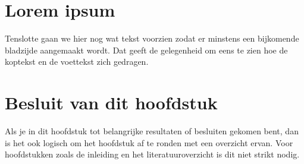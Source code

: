 \section{Lorem ipsum}
Tenslotte gaan we hier nog wat tekst voorzien zodat er minstens een
bijkomende bladzijde aangemaakt wordt. Dat geeft de gelegenheid om eens te
zien hoe de koptekst en de voettekst zich gedragen.

\section{Besluit van dit hoofdstuk}
Als je in dit hoofdstuk tot belangrijke resultaten of besluiten gekomen
bent, dan is het ook logisch om het hoofdstuk af te ronden met een
overzicht ervan. Voor hoofdstukken zoals de inleiding en het
literatuuroverzicht is dit niet strikt nodig.

